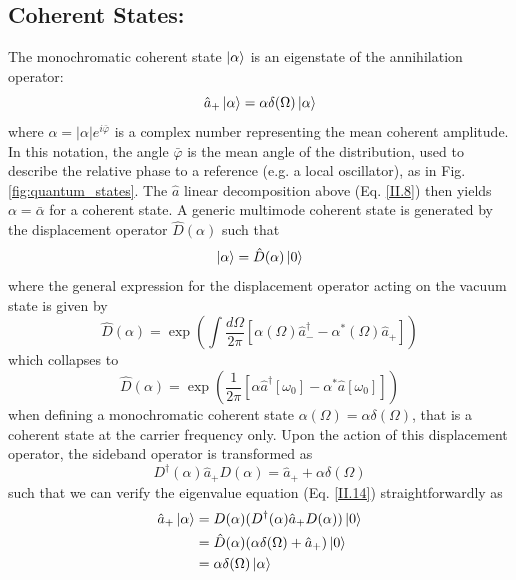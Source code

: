 \subsection*{Coherent States:}
The monochromatic coherent state $\ket{\alpha}$ is an eigenstate of the annihilation operator:
\begin{equation}
\hat{a}_+\ket{\alpha} = \alpha \delta(\Omega) \ket{\alpha}
\label{II.14}
\end{equation}
where $\alpha = |\alpha| e^{i\bar{\varphi}}$ is a complex number representing the mean coherent amplitude. In this notation, the angle $\bar{\varphi}$ is the mean angle of the distribution, used to describe the relative phase to a reference (e.g. a local oscillator), as in Fig. \ref{fig:quantum_states}. The $\hat{a}$ linear decomposition above (Eq. \ref{II.8}) then yields $\alpha = \bar{\alpha}$ for a coherent state. A generic multimode coherent state is generated by the displacement operator $\hat D(\alpha)$ such that 
\begin{equation}
\ket{\alpha} = \hat D(\alpha) \ket{0}
\end{equation}
where the general expression for the displacement operator acting on the vacuum state is given by
\begin{equation}
  \hat D (\alpha) = \exp\!\left(\int \dfrac{d\Omega}{2\pi} \left[ \alpha(\Omega) \hat{a}^\dagger_- - \alpha^*(\Omega) \hat{a}_+ \right] \right)
\end{equation}
which collapses to 
\begin{equation}
  \hat D (\alpha) = \exp\!\left( \dfrac{1}{2\pi} \left[ \alpha \hat{a}^\dagger[\omega_0] - \alpha^* \hat{a}[\omega_0] \right] \right)
\end{equation}
when defining a monochromatic coherent state $\alpha(\Omega) = \alpha \delta(\Omega)$, that is a coherent state at the carrier frequency only. 
Upon the action of this displacement operator, the sideband operator is transformed as
\begin{equation}
D^\dagger(\alpha) \hat{a}_+ D(\alpha) = \hat{a}_+ + \alpha \delta(\Omega)
\label{II.18}
\end{equation}  
such that we can verify the eigenvalue equation (Eq. \ref{II.14}) straightforwardly as 
\begin{equation*}
  \begin{split}
    \hat{a}_+ \ket{\alpha} & = D(\alpha) (D^\dagger(\alpha) \hat{a}_+ D(\alpha)) \ket{0} \\
    & = \hat D(\alpha) (\alpha \delta(\Omega) + \hat a_+ )  \ket{0} \\
    &= \alpha \delta(\Omega)  \ket{\alpha}
  \end{split}
\end{equation*}

